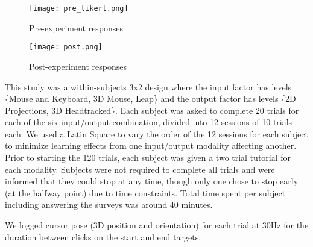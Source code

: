 \begin{figure}
    \centering
    \texttt{[image: pre\_likert.png]}
    \caption{Pre-experiment responses}
    \label{fig:pre_likert}
\end{figure}

\begin{figure}
    \centering
    \texttt{[image: post.png]}
    \caption{Post-experiment responses}
    \label{fig:post}
\end{figure}

This study was a within-subjects 3x2 design where the input factor has levels
\{Mouse and Keyboard, 3D Mouse, Leap\} and the output factor has levels \{2D
Projections, 3D Headtracked\}.  Each subject was asked to complete 20 trials
for each of the six input/output combination, divided into 12 sessions of 10
trials each.  We used a Latin Square to vary the order of the 12 sessions for
each subject to minimize learning effects from one input/output modality
affecting another.  Prior to starting the 120 trials, each subject was given a
two trial tutorial for each modality.  Subjects were not required to complete
all trials and were informed that they could stop at any time, though only one
chose to stop early (at the halfway point) due to time constraints.  Total
time spent per subject including answering the surveys was around 40 minutes.

We logged cursor pose (3D position and orientation) for each trial at 30Hz for
the duration between clicks on the start and end targets.

